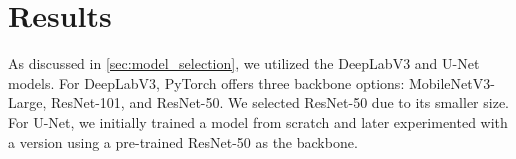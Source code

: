 \section{Results}
As discussed in \autoref{sec:model_selection}, we utilized the DeepLabV3 and U-Net models. For DeepLabV3, PyTorch offers three backbone options: MobileNetV3-Large, ResNet-101, and ResNet-50. We selected ResNet-50 due to its smaller size. For U-Net, we initially trained a model from scratch and later experimented with a version using a pre-trained ResNet-50 as the backbone.











